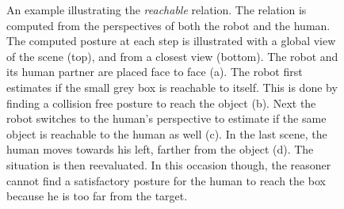 \documentclass[preprint,3p,times]{elsarticle}
\begin{document}
\begin{figure}[!t]
	\centering
    \caption{An example illustrating the \textit{reachable} relation. The
        relation is computed from the perspectives of both the robot and the
        human. The computed posture at each step is illustrated with a global
        view of the scene (top), and from a closest view (bottom). The robot
        and its human partner are placed face to face (a).  The robot first
        estimates if the small grey box is reachable to itself. This is done by
        finding a collision free posture to reach the object (b). Next the
        robot switches to the human's perspective to estimate if the same
        object is reachable to the human as well (c).  In the last scene, the
        human moves towards his left, farther from the object (d). The
        situation is then reevaluated. In this occasion though, the reasoner
        cannot find a satisfactory posture for the human to reach the box
        because he is too far from the target.  }

\label{fig::reach-ex}
\end{figure}
\end{document}
